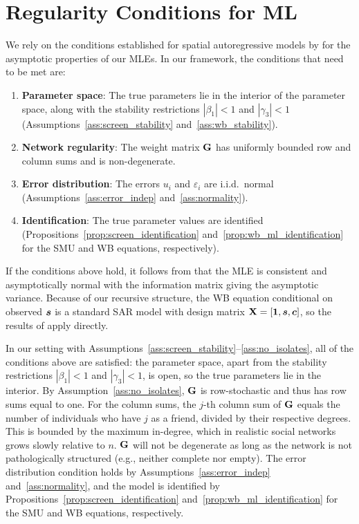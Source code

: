 \section{Regularity Conditions for ML}
\label{sec:est:regularity}
We rely on the conditions established for spatial autoregressive models by \textcite[Thm.~3.2, p.~1906; Assumptions 1--8, pp.~1902--1904]{Lee2004} for the asymptotic properties of our MLEs. In our framework, the conditions that need to be met are:

\begin{enumerate}
    \item \textbf{Parameter space}: The true parameters lie in the interior of the parameter space, along with the stability restrictions $|\beta_1| < 1$ and $|\gamma_3| < 1$ (Assumptions~\ref{ass:screen_stability} and~\ref{ass:wb_stability}).
    \item \textbf{Network regularity}: The weight matrix $\mathbf{G}$ has uniformly bounded row and column sums and is non-degenerate.
    \item \textbf{Error distribution}: The errors $u_i$ and $\varepsilon_i$ are i.i.d.\ normal (Assumptions~\ref{ass:error_indep} and~\ref{ass:normality}).
    \item \textbf{Identification}: The true parameter values are identified (Propositions~\ref{prop:screen_identification} and~\ref{prop:wb_ml_identification} for the SMU and WB equations, respectively).
\end{enumerate}

If the conditions above hold, it follows from \textcite[Thm.~3.2, p.~1906]{Lee2004} that the MLE is consistent and asymptotically normal with the information matrix giving the asymptotic variance. Because of our recursive structure, the WB equation conditional on observed $\bm{s}$ is a standard SAR model with design matrix $\mathbf{X} = [\bm{1}, \bm{s}, \bm{c}]$, so the results of \textcite{Lee2004} apply directly.

In our setting with Assumptions~\ref{ass:screen_stability}--\ref{ass:no_isolates}, all of the conditions above are satisfied: the parameter space, apart from the stability restrictions $|\beta_1| < 1$ and $|\gamma_3| < 1$, is open, so the true parameters lie in the interior. By Assumption~\ref{ass:no_isolates}, $\mathbf{G}$ is row-stochastic and thus has row sums equal to one. For the column sums, the $j$-th column sum of $\mathbf{G}$ equals the number of individuals who have $j$ as a friend, divided by their respective degrees. This is bounded by the maximum in-degree, which in realistic social networks grows slowly relative to $n$. $\mathbf{G}$ will not be degenerate as long as the network is not pathologically structured (e.g., neither complete nor empty). The error distribution condition holds by Assumptions~\ref{ass:error_indep} and~\ref{ass:normality}, and the model is identified by Propositions~\ref{prop:screen_identification} and~\ref{prop:wb_ml_identification} for the SMU and WB equations, respectively.

